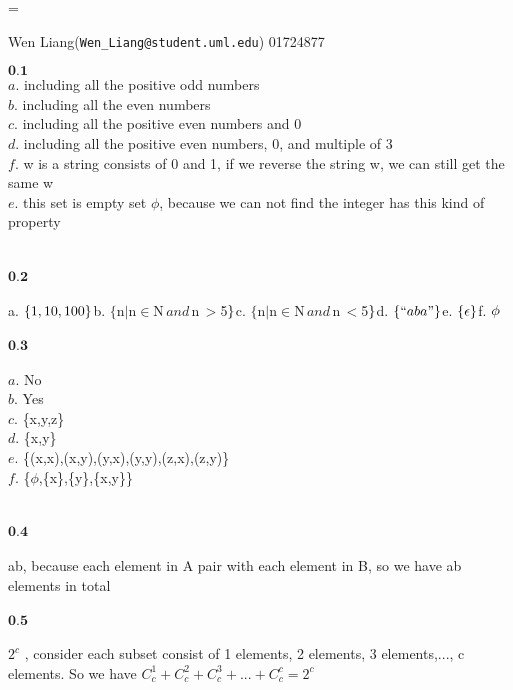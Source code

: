 \documentclass{scrartcl}
\begin{document}
\hfuzz=\maxdimen
{}
\begin{center}
Wen Liang(\texttt{Wen\_Liang@student.uml.edu}) 01724877
\end{center}



\noindent$\textbf{0.1}$
\\

 \noindent$a.\,\,$including all the positive odd numbers\\
 $b.\,\,$including all the even numbers\\
 $c.\,\,$including all the positive even numbers and 0\\
$d.$\,\,including all the positive even numbers, 0, and multiple of 3\\
 $f.\,\,$w is a string consists of 0 and 1, if we reverse the string w, we can still get the same w\\
  $e.\,\,$this set is empty set $\phi$, because we can not find the integer has this kind of property\\
\\
\\
$\textbf{0.2}$
\\
\\
$
$a.$ \,\,\{1,10,100\}\\
$b.$ \,\,\{$n$\mid$n$ \in $N$ \,and \, $n$\, > $5$\}\\
$c.$ \,\,\{$n$\mid$n$ \in $N$ \,and \, $n$\, < $5$\}\\
$d.$ \,\,\{``aba"\}\\
$e.$ \,\,\{\epsilon\}\\
$f.$ \,\,\phi\\
$ 
\\
\\
$\textbf{0.3}$
\\
\\
$a.\,\,$No\\
$b.\,\,$Yes\\
$c.\,\,$\{x,y,z\}\\
$d.\,\,$\{x,y\}\\
$e.\,\,$\{(x,x),(x,y),(y,x),(y,y),(z,x),(z,y)\}\\
$f.\,\,$\{$\phi$,\{x\},\{y\},\{x,y\}\}\\
\\
\\

\noindent$\textbf{0.4}$
\\
\\
ab, because each element in A pair with each element in B, so we have ab elements in total
\\
\\
$\textbf{0.5}$ 
\\
\\
$2^c$ , consider each subset consist of 1 elements, 2 elements, 3 elements,..., c elements. So we have $C_c^1+C_c^2+C_c^3+...+C_c^c=2^c$\\
\\
\end{document}
